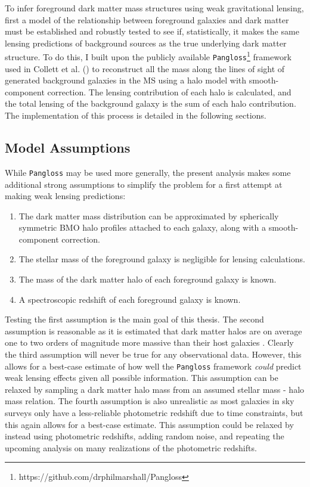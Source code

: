 \documentclass[%
 reprint,
 amsmath,amssymb,
 aps,nofootinbib
]{revtex4-1}
\begin{document}
To infer foreground dark matter mass structures using weak gravitational lensing, first a model of the relationship between foreground galaxies and dark matter must be established and robustly tested to see if, statistically, it makes the same lensing predictions of background sources as the true underlying dark matter structure. To do this, I built upon the publicly available \texttt{Pangloss}\footnote{\label{note1}https://github.com/drphilmarshall/Pangloss} framework used in Collett et al. (\cite{collett_marshall}) to reconstruct all the
mass along the lines of sight of generated background galaxies in the MS using a halo model with smooth-component correction. The lensing contribution of each halo is calculated, and the total lensing of the background galaxy is the sum of each halo contribution. The implementation of this process is detailed in the following sections.


\subsection{Model Assumptions} \label{assumptions}
While \texttt{Pangloss} may be used more generally, the present analysis makes some additional strong assumptions to simplify the problem for a first attempt at making weak lensing predictions:

\begin{enumerate}
\item The dark matter mass distribution can be approximated by spherically symmetric BMO halo profiles attached to each galaxy, along with a smooth-component correction.
\item The stellar mass of the foreground galaxy is negligible for lensing calculations.
\item The mass of the dark matter halo of each foreground galaxy is known.
\item A spectroscopic redshift of each foreground galaxy is known.
\end{enumerate}

Testing the first assumption is the main goal of this thesis. The second assumption is reasonable as it is estimated that dark matter halos are on average one to two orders of magnitude more massive than their host galaxies \cite{smhr}. Clearly the third assumption will never be true for any observational data. However, this allows for a best-case estimate of how well the \texttt{Pangloss} framework \textit{could} predict weak lensing effects given all possible information. This assumption can be relaxed by sampling a dark matter halo mass from an assumed stellar mass - halo mass relation. The fourth assumption is also unrealistic as most galaxies in sky surveys only have a less-reliable photometric redshift due to time constraints, but this again allows for a best-case estimate. This assumption could be relaxed by instead using photometric redshifts, adding random noise, and repeating the upcoming analysis on many realizations of the photometric redshifts.
\end{document}
